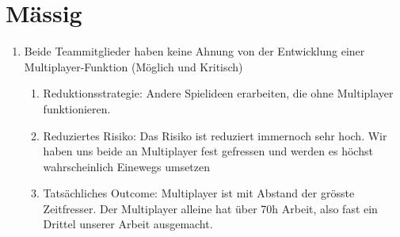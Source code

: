 \section{Mässig}
\begin{enumerate}
    \item Beide Teammitglieder haben keine Ahnung von der Entwicklung einer Multiplayer-Funktion (Möglich und Kritisch)
    \begin{enumerate}
    \item Reduktionsstrategie: Andere Spielideen erarbeiten, die ohne Multiplayer funktionieren.
    \item Reduziertes Risiko: Das Risiko ist reduziert immernoch sehr hoch.
          Wir haben uns beide an Multiplayer fest gefressen und werden es höchst wahrscheinlich Einewegs umsetzen
    \item Tatsächliches Outcome: Multiplayer ist mit Abstand der grösste Zeitfresser.
          Der Multiplayer alleine hat über 70h Arbeit, also fast ein Drittel unserer Arbeit ausgemacht.
    \end{enumerate}
% 
% 
% 
\end{enumerate}

